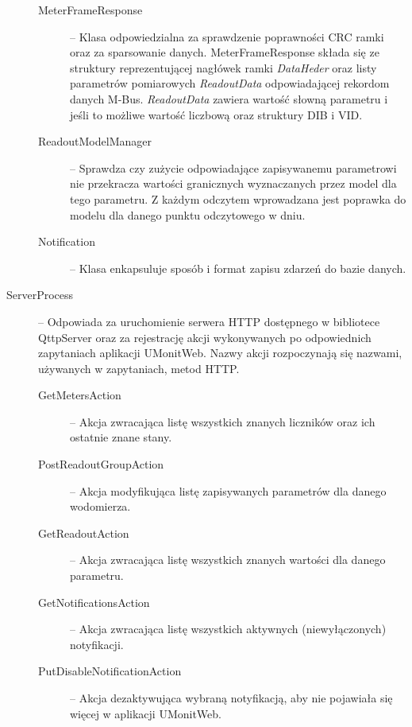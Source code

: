 \begin{description}
\begin{description}
			\item[MeterFrameResponse] -- Klasa odpowiedzialna za sprawdzenie poprawności CRC ramki oraz za sparsowanie danych.
			MeterFrameResponse składa się ze struktury reprezentującej nagłówek ramki \textit{DataHeder} oraz listy parametrów pomiarowych \textit{ReadoutData} odpowiadającej rekordom danych M-Bus.
			\textit{ReadoutData} zawiera wartość słowną parametru i jeśli to możliwe wartość liczbową oraz struktury DIB i VID.

			\item[ReadoutModelManager] -- Sprawdza czy zużycie odpowiadające zapisywanemu parametrowi nie przekracza wartości granicznych wyznaczanych przez model dla tego parametru.
			Z każdym odczytem wprowadzana jest poprawka do modelu dla danego punktu odczytowego w dniu.

			\item[Notification] -- Klasa enkapsuluje sposób i format zapisu zdarzeń do bazie danych.

		\end{description}

	\item[ServerProcess] -- Odpowiada za uruchomienie serwera HTTP dostępnego w bibliotece QttpServer oraz za rejestrację akcji wykonywanych po odpowiednich zapytaniach aplikacji UMonitWeb.
	Nazwy akcji rozpoczynają się nazwami, używanych w zapytaniach, metod HTTP.

		\begin{description}
			\item[GetMetersAction] -- Akcja zwracająca listę wszystkich znanych liczników oraz ich ostatnie znane stany.

			\item[PostReadoutGroupAction] -- Akcja modyfikująca listę zapisywanych parametrów dla danego wodomierza.

			\item[GetReadoutAction] -- Akcja zwracająca listę wszystkich znanych wartości dla danego parametru.

			\item[GetNotificationsAction] -- Akcja zwracająca listę wszystkich aktywnych (niewyłączonych) notyfikacji.

			\item[PutDisableNotificationAction] -- Akcja dezaktywująca wybraną notyfikacją, aby nie pojawiała się więcej w aplikacji UMonitWeb.

		\end{description}


\end{description}
